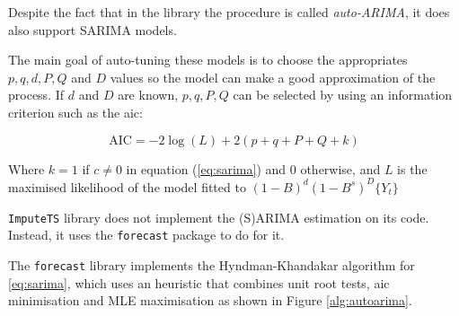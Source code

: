 Despite the fact that in the library the procedure is called \emph{auto-ARIMA}, it does also support SARIMA models.

The main goal of auto-tuning these models is to choose the appropriates $p, q, d, P, Q$ and $D$ values so the model can make a good approximation of the process. If $d$ and $D$ are known, $p, q, P, Q$ can be selected by using an information criterion such as the \ac{aic}\cite{Akaike1998}:

\begin{equation}
	\text{AIC} = -2\log(L) + 2(p+q+P+Q+k)
\end{equation}

Where $k=1$ if $c\neq0$ in equation (\ref{eq:sarima}) and $0$ otherwise, and $L$ is the maximised likelihood of the model fitted to $(1-B)^d (1-B^s)^D \{Y_t\}$\cite{autoarimaLib} 

\texttt{ImputeTS} library does not implement the (S)ARIMA estimation on its code. Instead, it uses the \texttt{forecast} package to do for it\cite{imputeTS}.

The \texttt{forecast} library implements the Hyndman-Khandakar algorithm for \ref{eq:sarima}, which uses an heuristic that combines unit root tests, \ac{aic} minimisation and MLE maximisation as shown in Figure \ref{alg:autoarima}\cite{autoarimaLib}.

